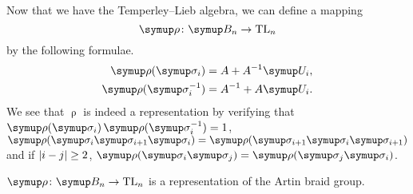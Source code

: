Now that we have the Temperley--Lieb algebra, we can define a mapping \[\uprho \colon \B_n \rightarrow \TL_n\] by the following formulae.
\begin{align*}
	\uprho (\sigmaa_i) &= A + A^{-1}\U_i,\\
	\uprho (\sigmaa_i^{-1}) &= A^{-1} + A\U_i.
\end{align*}
We see that \(\uprho\) is indeed a representation by verifying that \(\uprhoo(\sigmaa_i)\uprhoo(\sigmaa_i^{-1}) = 1\), \(\uprhoo(\sigmaa_i \sigmaa_{i+1} \sigmaa_i) = \uprhoo(\sigmaa_{i+1} \sigmaa_i \sigmaa_{i+1})\) and if  \(\lvert i-j\rvert \geq 2\), \(\uprhoo(\sigmaa_i\sigmaa_j) = \uprhoo(\sigmaa_j\sigmaa_i)\).
\begin{prop}
	\(\uprhoo \colon \B_n \rightarrow \TL_n\) is a representation of the Artin braid group.
\end{prop}
